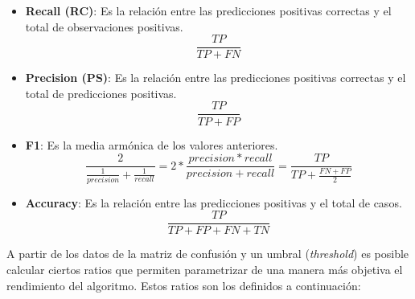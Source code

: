 \begin{itemize}
    \label{list:scores}
    \item\textbf{Recall (RC)}: Es la relación entre las predicciones positivas correctas y el total de observaciones positivas.
    \begin{equation}
        \frac{TP}{TP + FN}
    \end{equation}

    \item \textbf{Precision (PS)}: Es la relación entre las predicciones positivas correctas y el total de predicciones positivas.
          \begin{equation}
              \frac{TP}{TP  + FP}
          \end{equation}

    \item \textbf{F1}: Es la media armónica de los valores anteriores.
          \begin{equation}
              \frac{2}{\frac{1}{precision} + \frac{1}{recall}} = 2 * \frac{precision *
                  recall}{precision + recall} = \frac{TP}{TP + \frac{FN + FP}{2}}
          \end{equation}

    \item \textbf{Accuracy}: Es la relación entre las predicciones positivas y el total de casos.
          \begin{equation}
              \frac{TP}{TP + FP + FN + TN}
          \end{equation}
\end{itemize}

A partir de los datos de la matriz de confusión y un umbral (\textit{threshold}) es posible calcular ciertos ratios que permiten parametrizar de una manera más objetiva el rendimiento del algoritmo. Estos ratios son los definidos a continuación:

